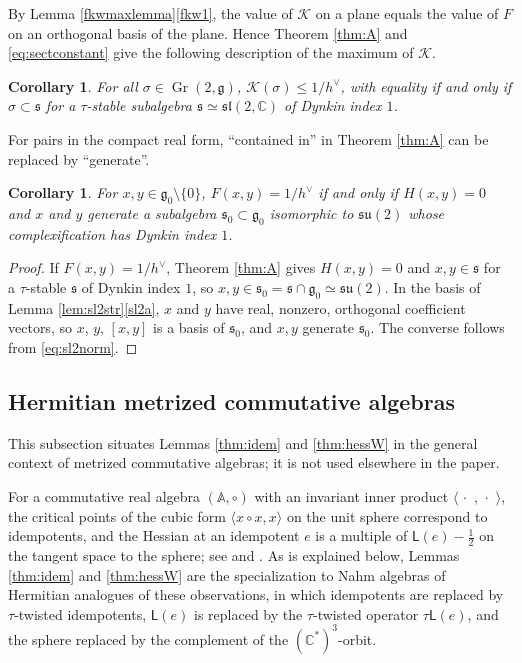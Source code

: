 \documentclass [leqno, 10pt]{amsart}
\newtheorem{corollary}[theorem]{Corollary}%
\theoremstyle{definition}
\numberwithin{equation}{section}
\newcommand{\grass}{\operatorname{Gr}}
\newcommand{\sect}{\mathscr{K}}
\newcommand{\alg}{\mathbb{A}}
\newcommand{\mlt}{\circ}
\newcommand{\dum}{\,\cdot\,\,}
\newcommand{\lin}{\mathsf{L}}
\newcommand{\su}{\mathfrak{su}}
\newcommand{\sll}{\mathfrak{sl}}
\newcommand{\g}{\mathfrak{g}}
\newcommand{\com}{\mathbb C}
\newcommand{\gz}{\g_{0}}
\newcommand{\hv}{h^\vee}
\newcommand{\subs}{\mathfrak{s}}
\begin{document}
By Lemma \ref{fkwmaxlemma}\ref{fkw1}, the value of $\sect$ on a plane equals the value of $F$ on an orthogonal basis of the plane. Hence Theorem \ref{thm:A} and \eqref{eq:sectconstant} give the following description of the maximum of $\sect$.
\begin{corollary}\label{cor:sectmax}
For all $\sigma \in \grass(2, \g)$, $\sect(\sigma)  \leq 1/\hv$, with equality if and only if $\sigma \subset \subs$ for a $\tau$-stable subalgebra $\subs \simeq \sll(2, \com)$ of Dynkin index $1$.
\end{corollary}

For pairs in the compact real form, ``contained in'' in Theorem \ref{thm:A} can be replaced by ``generate''.
\begin{corollary}\label{cor:compactequality}
For $x, y \in \gz\setminus\{0\}$, $F(x, y) = 1/\hv$ if and only if $H(x, y) = 0$ and $x$ and $y$ generate a subalgebra $\subs_{0} \subset \gz$ isomorphic to $\su(2)$ whose complexification has Dynkin index $1$.
\end{corollary}
\begin{proof}
If $F(x, y) = 1/\hv$, Theorem \ref{thm:A} gives $H(x, y) = 0$ and $x, y \in \subs$ for a $\tau$-stable $\subs$ of Dynkin index $1$, so $x, y \in \subs_{0} = \subs \cap \gz \simeq \su(2)$. In the basis of Lemma \ref{lem:sl2str}\ref{sl2a}, $x$ and $y$ have real, nonzero, orthogonal coefficient vectors, so $x$, $y$, $[x, y]$ is a basis of $\subs_{0}$, and $x, y$ generate $\subs_{0}$. The converse follows from \eqref{eq:sl2norm}.
\end{proof}

\subsection{Hermitian metrized commutative algebras}\label{sec:hermitianmetrized}
This subsection situates Lemmas \ref{thm:idem} and \ref{thm:hessW} in the general context of metrized commutative algebras; it is not used elsewhere in the paper.

For a commutative real algebra $(\alg, \mlt)$ with an invariant inner product $\langle\dum, \dum\rangle$, the critical points of the cubic form $\langle x \mlt x, x\rangle$ on the unit sphere correspond to idempotents, and the Hessian at an idempotent $e$ is a multiple of $\lin(e) - \tfrac{1}{2}$ on the tangent space to the sphere; see \cite[Lemma $2.3$]{Tkachev-correction} and \cite{Fox-trace, Fox-Tkachev, Tkachev-universality}. As is explained below, Lemmas \ref{thm:idem} and \ref{thm:hessW} are the specialization to Nahm algebras of Hermitian analogues of these observations, in which idempotents are replaced by $\tau$-twisted idempotents, $\lin(e)$ is replaced by the $\tau$-twisted operator $\tau\lin(e)$, and the sphere replaced by the complement of the $(\com^{\ast})^{3}$-orbit. 
\end{document}
